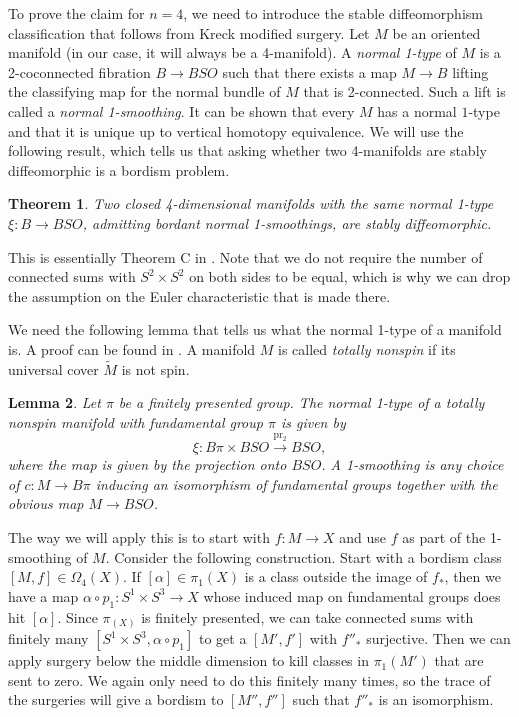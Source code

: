 \documentclass{amsart}
\newtheorem{thm}{Theorem}[section]
\newtheorem{lem}[thm]{Lemma}
\theoremstyle{definition}
\theoremstyle{remark}
\begin{document}
To prove the claim for $n=4$, we need to introduce the stable diffeomorphism classification that follows from Kreck modified surgery. Let $M$ be an oriented manifold (in our case, it will always be a 4-manifold). A \textit{normal 1-type} of $M$ is a 2-coconnected fibration $B\to BSO$ such that there exists a map $M\to B$ lifting the classifying map for the normal bundle of $M$ that is 2-connected. Such a lift is called a \textit{normal 1-smoothing}. It can be shown that every $M$ has a normal $1$-type and that it is unique up to vertical homotopy equivalence. We will use the following result, which tells us that asking whether two 4-manifolds are stably diffeomorphic is a bordism problem.

\begin{thm}
    Two closed 4-dimensional manifolds with the same normal 1-type \( \xi: B \to BSO \), admitting bordant normal 1-smoothings, are stably diffeomorphic.
\end{thm}
This is essentially Theorem C in \cite{kreck1999surgery}. Note that we do not require the number of connected sums with $S^2\times S^2$ on both sides to be equal, which is why we can drop the assumption on the Euler characteristic that is made there.

We need the following lemma that tells us what the normal 1-type of a manifold is. A proof can be found in \cite[Section 3]{KLPT-stable4mnflds}. A manifold $M$ is called \textit{totally nonspin} if its universal cover $\widetilde{M}$ is not spin.

\begin{lem}
\label{totally-nonspin}
    Let \( \pi \) be a finitely presented group. The normal 1-type of a totally 
    nonspin manifold with fundamental group \( \pi \) is given by  
        \[\xi: B\pi \times BSO \xrightarrow{\operatorname{pr}_2} BSO,\]
    where the map is given by the projection onto \( BSO \). A 1-smoothing is any choice of $c:M\to B\pi$ inducing an isomorphism of fundamental groups together with the obvious map $M\to BSO$.
\end{lem}

The way we will apply this is to start with $f:M\to X$ and use $f$ as part of the 1-smoothing of $M$. Consider the following construction. Start with a bordism class $[M,f]\in \Omega_4(X)$. If $[\alpha]\in\pi_1(X)$ is a class outside the image of $f_*$, then we have a map $\alpha\circ p_1: S^1\times S^3 \to X$ whose induced map on fundamental groups does hit $[\alpha]$. Since $\pi_(X)$ is finitely presented, we can take connected sums with finitely many $[S^1\times S^3,\alpha\circ p_1]$ to get a $[M',f']$ with $f''_*$ surjective. Then we can apply surgery below the middle dimension to kill classes in $\pi_1(M')$ that are sent to zero. We again only need to do this finitely many times, so the trace of the surgeries will give a bordism to $[M'',f'']$ such that $f''_*$ is an isomorphism.
\end{document}
